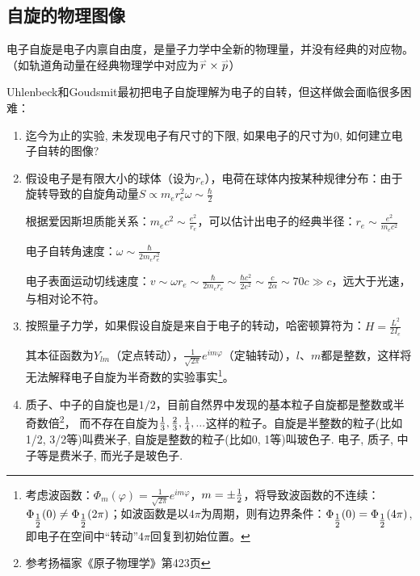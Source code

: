 \subsection{自旋的物理图像}

电子自旋是电子内禀自由度，是量子力学中全新的物理量，并没有经典的对应物。（如轨道角动量在经典物理学中对应为$\mathord{\buildrel{\lower3pt\hbox{$\scriptscriptstyle\rightharpoonup$}}
\over r}  \times
\mathord{\buildrel{\lower3pt\hbox{$\scriptscriptstyle\rightharpoonup$}}
\over p} $）


Uhlenbeck和Goudsmit最初把电子自旋理解为电子的自转，但这样做会面临很多困难：

\begin{enumerate}

\item 迄今为止的实验, 未发现电子有尺寸的下限, 如果电子的尺寸为0, 如何建立电子自转的图像?

    \item 假设电子是有限大小的球体（设为$r_e $），电荷在球体内按某种规律分布：由于旋转导致的自旋角动量$S \propto m_e r_e ^2 \omega  \sim \frac{\hbar }{2}$

根据爱因斯坦质能关系：$m_e c^2  \sim \frac{{e^2 }}{{r_e
}}$，可以估计出电子的经典半径：$r_e  \sim \frac{{e^2 }}{{m_e c^2 }}$


电子自转角速度：$\omega  \sim \frac{\hbar }{{2m_e r_e^2 }}$

电子表面运动切线速度：$v \sim \omega r_e  \sim \frac{\hbar }{{2m_e
r_e }} \sim \frac{{\hbar c^2 }}{{2e^2 }} \sim \frac{c}{{2\alpha }}
\sim 70c \gg c$，远大于光速，与相对论不符。



    \item 按照量子力学，如果假设自旋是来自于电子的转动，哈密顿算符为：$H = \frac{{L^2 }}{{2I_e }}$

其本征函数为$Y_{lm}$（定点转动），$\frac{1}{{\sqrt {2\pi }
}}e^{im\varphi }
$（定轴转动），$l$、$m$都是整数，这样将无法解释电子自旋为半奇数的实验事实\footnote{考虑波函数：$\Phi
_m (\varphi ) = \frac{1}{{\sqrt {2\pi } }}e^{im\varphi } $，$m =
\pm {\textstyle{1 \over 2}}$，将导致波函数的不连续：$\Phi
_{{\textstyle{1 \over 2}}} (0) \ne \Phi _{{\textstyle{1 \over 2}}}
(2\pi )$；如波函数是以$4 \pi$为周期，则有边界条件：$\Phi
_{{\textstyle{1 \over 2}}} (0) = \Phi _{{\textstyle{1 \over 2}}}
(4\pi )$, 即电子在空间中``转动''$4 \pi$回复到初始位置。}。

    \item 质子、中子的自旋也是$1/2$，目前自然界中发现的基本粒子自旋都是整数或半奇数倍\footnote{参考扬福家《原子物理学》第423页}，
而不存在自旋为${\textstyle{1 \over 3}},{\textstyle{2 \over
3}},{\textstyle{1 \over
4}},...$这样的粒子。自旋是半整数的粒子(比如1/2, 3/2等)叫费米子,
自旋是整数的粒子(比如0, 1等)叫玻色子. 电子, 质子, 中子等是费米子,
而光子是玻色子.
   \end{enumerate}



